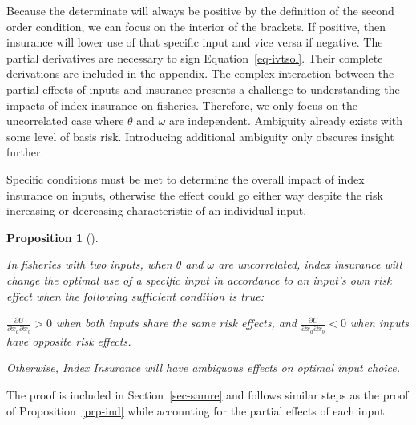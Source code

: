 \documentclass[
  letterpaper,
  DIV=11,
  numbers=noendperiod]{scrartcl}
\theoremstyle{plain}
\theoremstyle{plain}
\newtheorem{proposition}{Proposition}[section]
\theoremstyle{remark}
\begin{document}
Because the determinate will always be positive by the definition of the
second order condition, we can focus on the interior of the brackets. If
positive, then insurance will lower use of that specific input and vice
versa if negative. The partial derivatives are necessary to sign
Equation~\ref{eq-ivtsol}. Their complete derivations are included in the
appendix. The complex interaction between the partial effects of inputs
and insurance presents a challenge to understanding the impacts of index
insurance on fisheries. Therefore, we only focus on the uncorrelated
case where \(\theta\) and \(\omega\) are independent. Ambiguity already
exists with some level of basis risk. Introducing additional ambiguity
only obscures insight further.

Specific conditions must be met to determine the overall impact of index
insurance on inputs, otherwise the effect could go either way despite
the risk increasing or decreasing characteristic of an individual input.

\begin{proposition}[]\protect\hypertarget{prp-samre}{}\label{prp-samre}

In fisheries with two inputs, when \(\theta\) and \(\omega\) are
uncorrelated, index insurance will change the optimal use of a specific
input in accordance to an input's own risk effect when the following
sufficient condition is true:

\(\frac{\partial U}{\partial x_a\partial x_b}>0\) when both inputs share
the same risk effects, and
\(\frac{\partial U}{\partial x_a\partial x_b}<0\) when inputs have
opposite risk effects.

Otherwise, Index Insurance will have ambiguous effects on optimal input
choice.

\end{proposition}

The proof is included in Section~\ref{sec-samre} and follows similar
steps as the proof of Proposition~\ref{prp-ind} while accounting for the
partial effects of each input.
\end{document}
